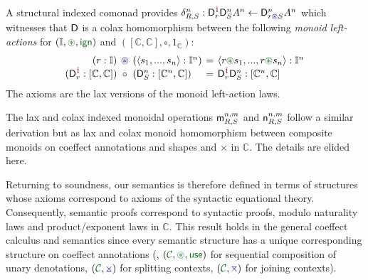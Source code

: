 \begin{proposition}
  A structural indexed comonad provides $\delta^n_{R,S} :
  \D^\sunit_r \D^n_S A^n \leftarrow \D^n_{r \aseq S} A^n$ which witnesses that $\mathsf{D}$ is a 
  colax homomorphism between the following \emph{monoid left-actions} for
  $(\mathbb{I}, \cseq, \czero)$ and $([\mathbb{C}, \mathbb{C}], \circ,
  1_{\mathbb{C}})$: 
\begin{align*}
\begin{array}{rclcl}
(r : \mathbb{I}) & \narrow{\aseq} & (\langle{s_1, ..., s_n}\rangle : \mathbb{I}^n) &\narrow{=}& \langle{r \cseq s_1, ..., r \cseq s_n}\rangle : \mathbb{I}^n  \\
(\D^\sunit_r : [\mathbb{C}, \mathbb{C}]) & \narrow{\circ} & (\D^n_S : [\mathbb{C}^n, \mathbb{C}]) &\narrow{=}& \D^\sunit_r \D^n_S : [\mathbb{C}^n, \mathbb{C}]
\end{array}
\end{align*}
The axioms are the lax versions of the monoid left-action laws. 
\end{proposition}
The lax and colax indexed monoidal operations $\mathsf{m}^{n,m}_{R,S}$ and $\mathsf{n}^{n,m}_{R,S}$ follow a similar derivation
but as lax and colax monoid homomorphism between composite monoids on coeffect annotations and shapes
and $\times$ in $\mathbb{C}$. The details are elided here. 

Returning to soundness, our semantics is therefore defined in terms of structures whose axioms correspond 
to axioms of the syntactic equational theory. Consequently, semantic proofs correspond to 
syntactic proofs, modulo naturality laws and product/exponent laws in $\mathbb{C}$. 
This result holds in the general coeffect calculus and semantics since every semantic structure
has a unique corresponding structure on coeffect annotations (\ie{}, $(\C, \cseq, \cunit)$ for
sequential composition of unary denotations, $(\C, \asplit)$ for splitting contexts, 
$(\C, \amerge)$ for joining contexts). 

